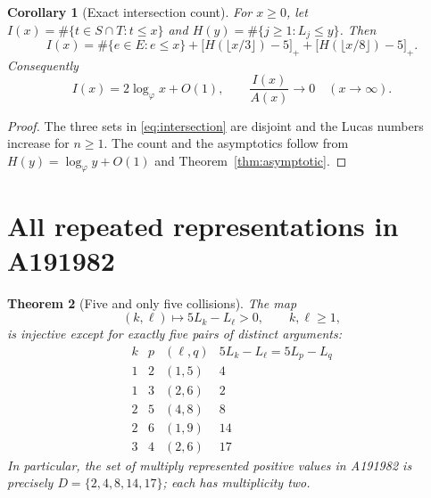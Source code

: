 \documentclass[11pt]{article}
\newtheorem{theorem}{Theorem}
\newtheorem{corollary}[theorem]{Corollary}
\begin{document}
\begin{corollary}[Exact intersection count]\label{cor:intercount}
For $x\ge0$, let $I(x)=\#\{t\in S\cap T:t\le x\}$
and $H(y)=\#\{j\ge1:L_j\le y\}$. Then
\[
\boxed{\displaystyle I(x)=\#\{e\in E:e\le x\}
+\big[H(\lfloor x/3\rfloor)-5\big]_+
+\big[H(\lfloor x/8\rfloor)-5\big]_+.}
\]
Consequently
\[
I(x)=2\log_\varphi x+O(1),\qquad
\frac{I(x)}{A(x)}\longrightarrow0
\quad (x\to\infty).
\]
\end{corollary}
\begin{proof}
The three sets in \eqref{eq:intersection} are disjoint and
the Lucas numbers increase for $n\ge1$.
The count and the asymptotics follow from
$H(y)=\log_\varphi y+O(1)$ and Theorem~\ref{thm:asymptotic}.
\end{proof}


\section*{All repeated representations in A191982}
\begin{theorem}[Five and only five collisions]\label{thm:duplicates}
The map
\[
(k,\ell)\longmapsto 5L_k-L_\ell>0,\qquad k,\ell\ge1,
\]
is injective except for exactly five pairs of distinct arguments:
\[
\begin{array}{c|c|c|c}
k&p&(\ell,q)&5L_k-L_\ell=5L_p-L_q\\ \hline
1&2&(1,5)&4\\
1&3&(2,6)&2\\
2&5&(4,8)&8\\
2&6&(1,9)&14\\
3&4&(2,6)&17
\end{array}
\]
In particular, the set of multiply represented positive values in
A191982 is precisely $D=\{2,4,8,14,17\}$; each has multiplicity two.
\end{theorem}
\end{document}
